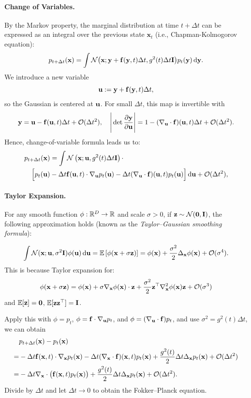 \paragraph{Change of Variables.}
By the Markov property, the marginal distribution at time $t + \Delta t$ can be expressed as an integral over the previous state $\mathbf{x}_t$ (i.e., Chapman-Kolmogorov equation):
\begin{align*}
p_{t+\Delta t}({\mathbf{x}})
= \int \mathcal N \big({\mathbf{x}}; {\mathbf{y}}+{\mathbf{f}}({\mathbf{y}},t)\Delta t, g^2(t)\Delta t {\mathbf{I}}\big) p_t({\mathbf{y}}) \mathop{}\!\mathrm{d}{\mathbf{y}}.
\end{align*}
 We introduce a new variable
\[
{\mathbf{u}}  :=  {\mathbf{y}}+{\mathbf{f}}({\mathbf{y}},t)\Delta t,
\]
so the Gaussian is centered at ${\mathbf{u}}$. For small $\Delta t$, this map is invertible with
\[
{\mathbf{y}}  =  {\mathbf{u}}-{\mathbf{f}}({\mathbf{u}},t)\Delta t+\mathcal O(\Delta t^2),
\quad
\Bigg|\det\frac{\partial {\mathbf{y}}}{\partial {\mathbf{u}}}\Bigg|
 = 1-(\nabla_{\mathbf{u}} \cdot{\mathbf{f}})({\mathbf{u}},t) \Delta t+\mathcal O(\Delta t^2).
\]
Hence, change-of-variable formula leads us to:
\begin{align*}
    p_{t+\Delta t}({\mathbf{x}})
&= \int \mathcal N\left({\mathbf{x}};{\mathbf{u}},g^2(t)\Delta t{\mathbf{I}}\right) \cdot
\\\quad\Big[p_t({\mathbf{u}})&-\Delta t {\mathbf{f}}({\mathbf{u}},t) \cdot \nabla_{\mathbf{u}} p_t({\mathbf{u}})
-\Delta t (\nabla_{\mathbf{u}} \cdot{\mathbf{f}})({\mathbf{u}},t) p_t({\mathbf{u}})\Big] \mathop{}\!\mathrm{d}{\mathbf{u}}
+\mathcal O(\Delta t^2),
\end{align*}

\paragraph{Taylor Expansion.}
For any smooth function $\phi:\mathbb{R}^D\to\mathbb{R}$ and scale $\sigma>0$,  
if ${\mathbf{z}}\sim\mathcal N(\bm{0},{\mathbf{I}})$, the following approximation holds  
(known as the \emph{Taylor–Gaussian smoothing formula}):

\[
\int \mathcal N({\mathbf{x}};{\mathbf{u}},\sigma^2{\mathbf{I}}) \phi({\mathbf{u}}) \mathop{}\!\mathrm{d}{\mathbf{u}}
=\mathbb{E} \left[\phi({\mathbf{x}}+\sigma{\mathbf{z}})\right]
=\phi({\mathbf{x}})+\frac{\sigma^2}{2} \Delta_{\mathbf{x}}\phi({\mathbf{x}})+\mathcal O(\sigma^4).
\]
This is because Taylor expansion for: 
\[
\phi({\mathbf{x}}+\sigma{\mathbf{z}})=\phi({\mathbf{x}})+\sigma\nabla_{\mathbf{x}}\phi({\mathbf{x}}) \cdot {\mathbf{z}}+\frac{\sigma^2}{2}{\mathbf{z}}^\top\nabla_{\mathbf{x}}^2\phi({\mathbf{x}}){\mathbf{z}}+\mathcal O(\sigma^3)
\]
and $\mathbb{E}[{\mathbf{z}}]=\bm{0}$, $\mathbb{E}[{\mathbf{z}}{\mathbf{z}}^\top]={\mathbf{I}}$.

Apply this with $\phi=p_t$, $\phi={\mathbf{f}} \cdot \nabla_{\mathbf{u}} p_t$, and $\phi=(\nabla_{\mathbf{u}} \cdot{\mathbf{f}}) p_t$, and use $\sigma^2=g^2(t)\Delta t$, we can obtain
\[
\begin{aligned}
&p_{t+\Delta t}({\mathbf{x}}) - p_t({\mathbf{x}})
\\=& -\Delta t {\mathbf{f}}({\mathbf{x}},t) \cdot \nabla_{\mathbf{x}} p_t({\mathbf{x}})
-\Delta t (\nabla_{\mathbf{x}} \cdot{\mathbf{f}})({\mathbf{x}},t) p_t({\mathbf{x}})
+\frac{g^2(t)}{2}\Delta t \Delta_{\mathbf{x}} p_t({\mathbf{x}})
+\mathcal O(\Delta t^2) 
\\=&  - \Delta t \nabla_{\mathbf{x}} \cdot \big({\mathbf{f}}({\mathbf{x}},t) p_t({\mathbf{x}})\big)
 + \frac{g^2(t)}{2} \Delta t \Delta_{\mathbf{x}} p_t({\mathbf{x}})
 + \mathcal O(\Delta t^2).
\end{aligned}
\]
Divide by $\Delta t$ and let $\Delta t\to0$ to obtain the Fokker–Planck equation.

